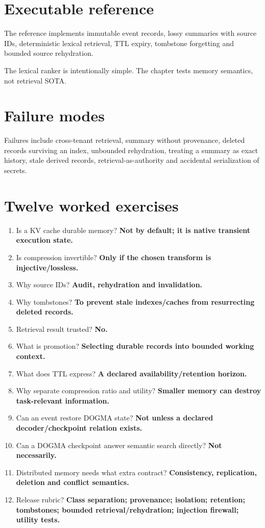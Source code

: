 \section{Executable reference}
The reference implements immutable event records, lossy summaries with source IDs, deterministic lexical retrieval, TTL expiry, tombstone forgetting and bounded source rehydration.

The lexical ranker is intentionally simple. The chapter tests memory semantics, not retrieval SOTA.

\section{Failure modes}
Failures include cross-tenant retrieval, summary without provenance, deleted records surviving an index, unbounded rehydration, treating a summary as exact history, stale derived records, retrieval-as-authority and accidental serialization of secrets.

\section{Twelve worked exercises}
\begin{enumerate}
\item Is a KV cache durable memory? \textbf{Not by default; it is native transient execution state.}
\item Is compression invertible? \textbf{Only if the chosen transform is injective/lossless.}
\item Why source IDs? \textbf{Audit, rehydration and invalidation.}
\item Why tombstones? \textbf{To prevent stale indexes/caches from resurrecting deleted records.}
\item Retrieval result trusted? \textbf{No.}
\item What is promotion? \textbf{Selecting durable records into bounded working context.}
\item What does TTL express? \textbf{A declared availability/retention horizon.}
\item Why separate compression ratio and utility? \textbf{Smaller memory can destroy task-relevant information.}
\item Can an event restore DOGMA state? \textbf{Not unless a declared decoder/checkpoint relation exists.}
\item Can a DOGMA checkpoint answer semantic search directly? \textbf{Not necessarily.}
\item Distributed memory needs what extra contract? \textbf{Consistency, replication, deletion and conflict semantics.}
\item Release rubric? \textbf{Class separation; provenance; isolation; retention; tombstones; bounded retrieval/rehydration; injection firewall; utility tests.}
\end{enumerate}


